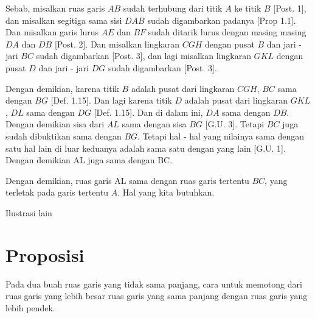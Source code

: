 \documentclass[a4paper]{book}
\begin{document}
Sebab, misalkan ruas garis $AB$ sudah terhubung dari titik $A$ ke titik $B$
[Post. 1], dan misalkan segitiga sama sisi $DAB$ sudah digambarkan 
padanya [Prop 1.1]. Dan misalkan garis lurus $AE$ dan $BF$ sudah 
ditarik lurus dengan masing masing $DA$ dan $DB$ [Post. 2]. Dan
misalkan lingkaran $CGH$ dengan pusat $B$ dan jari - jari $BC$ sudah 
digambarkan [Post. 3], dan lagi misalkan lingkaran $GKL$ dengan pusat $D$
dan jari - jari $DG$ sudah digambarkan [Post. 3].  

Dengan demikian, karena titik $B$ adalah pusat dari lingkaran $CGH$, $BC$ sama 
dengan $BG$ [Def. 1.15].  Dan lagi karena titik $D$ adalah pusat dari 
lingkaran $GKL$, $DL$ sama dengan $DG$ [Def. 1.15]. Dan di dalam ini, $DA$
sama dengan $DB$. Dengan demikian sisa dari $AL$ sama dengan sisa $BG$
[G.U. 3]. Tetapi $BC$ juga sudah dibuktikan sama dengan $BG$. Tetapi hal - hal
yang nilainya sama dengan satu hal lain di luar keduanya adalah sama satu 
dengan yang lain [G.U. 1]. Dengan demikian AL juga sama dengan BC.

Dengan demikian, ruas garis AL sama dengan ruas garis tertentu
$BC$, yang terletak pada garis tertentu $A$. Hal yang kita butuhkan.  

Ilustrasi lain
\begin{center}
\end{center}

\section*{\centering Proposisi \thesection} 

Pada dua buah ruas garis yang tidak sama panjang, cara untuk
memotong dari ruas garis yang lebih besar ruas garis yang sama panjang dengan
ruas garis yang lebih pendek.
\end{document}
